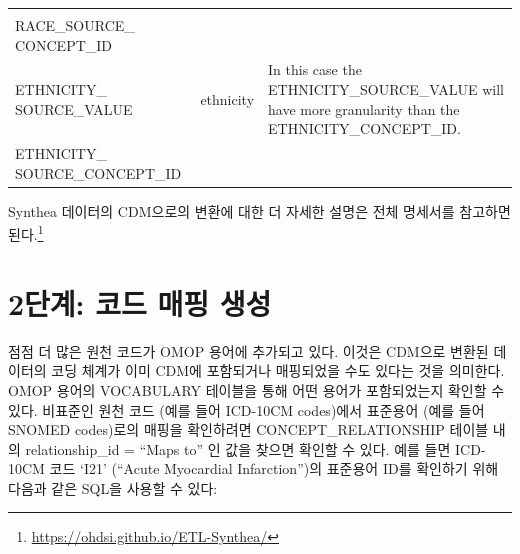 \documentclass[10.5pt]{book}
\let\rmarkdownfootnote\footnote%
\def\footnote{\protect\rmarkdownfootnote}
\theoremstyle{definition}
\theoremstyle{definition}
\theoremstyle{definition}
\theoremstyle{remark}
\begin{document}
\begin{longtable}[]{@{}lll@{}}
\begin{minipage}[t]{0.50\columnwidth}
\strut
\end{minipage}\tabularnewline
\begin{minipage}[t]{0.28\columnwidth}\raggedright\strut
RACE\_SOURCE\_ CONCEPT\_ID\strut
\end{minipage} & \begin{minipage}[t]{0.13\columnwidth}\raggedright\strut
\strut
\end{minipage} & \begin{minipage}[t]{0.50\columnwidth}\raggedright\strut
\strut
\end{minipage}\tabularnewline
\begin{minipage}[t]{0.28\columnwidth}\raggedright\strut
ETHNICITY\_ SOURCE\_VALUE\strut
\end{minipage} & \begin{minipage}[t]{0.13\columnwidth}\raggedright\strut
ethnicity\strut
\end{minipage} & \begin{minipage}[t]{0.50\columnwidth}\raggedright\strut
In this case the ETHNICITY\_SOURCE\_VALUE will have more granularity
than the ETHNICITY\_CONCEPT\_ID.\strut
\end{minipage}\tabularnewline
\begin{minipage}[t]{0.28\columnwidth}\raggedright\strut
ETHNICITY\_ SOURCE\_CONCEPT\_ID\strut
\end{minipage} & \begin{minipage}[t]{0.13\columnwidth}\raggedright\strut
\strut
\end{minipage} & \begin{minipage}[t]{0.50\columnwidth}\raggedright\strut
\strut
\end{minipage}\tabularnewline
\bottomrule
\end{longtable}

Synthea 데이터의 CDM으로의 변환에 대한 더 자세한 설명은 전체 명세서를
참고하면 된다.\footnote{\url{https://ohdsi.github.io/ETL-Synthea/}}

\section{2단계: 코드 매핑 생성}\label{---}

점점 더 많은 원천 코드가 OMOP 용어에 추가되고 있다. 이것은 CDM으로
변환된 데이터의 코딩 체계가 이미 CDM에 포함되거나 매핑되었을 수도 있다는
것을 의미한다. OMOP 용어의 VOCABULARY 테이블을 통해 어떤 용어가
포함되었는지 확인할 수 있다. 비표준인 원천 코드 (예를 들어 ICD-10CM
codes)에서 표준용어 (예를 들어 SNOMED codes)로의 매핑을 확인하려면
CONCEPT\_RELATIONSHIP 테이블 내의 relationship\_id = ``Maps to'' 인 값을
찾으면 확인할 수 있다. 예를 들면 ICD-10CM 코드 `I21' (``Acute Myocardial
Infarction'')의 표준용어 ID를 확인하기 위해 다음과 같은 SQL을 사용할 수
있다:
\end{document}
